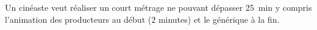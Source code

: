 
\begin{exercice}\label{exo2smath-0102}

    Un cinéaste veut réaliser un court métrage ne pouvant dépasser \SI{25}{\minute} y compris l'animation des producteurs au début (\( 2\) minutes) et le générique à la fin.


\end{exercice}
